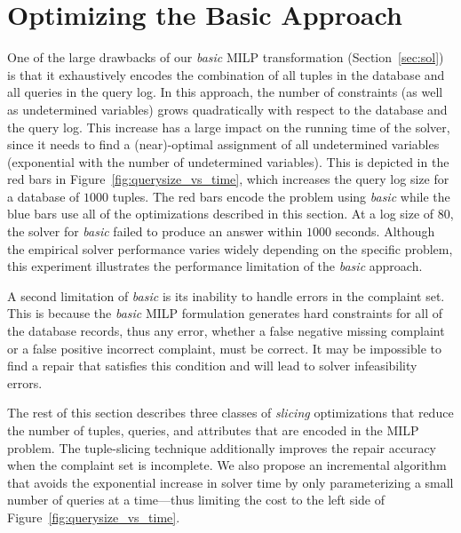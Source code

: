 
\section{Optimizing the Basic Approach}
\label{sec:opt}

One of the large drawbacks of our \emph{basic} MILP transformation (Section~\ref{sec:sol}) is
that it exhaustively encodes the combination of all tuples in the database and all queries
in the query log.  In this approach, the number of constraints (as well as undetermined variables) 
grows quadratically with respect to the database and the query log.
This increase has a large impact on the running time of the solver, since it needs to find a (near)-optimal 
assignment of all undetermined variables (exponential with the number of undetermined variables).
This is depicted in the red bars in Figure~\ref{fig:querysize_vs_time}, which increases
the query log size for a database of $1000$ tuples.  The red bars encode the problem using \emph{basic} while the blue bars
use all of the optimizations described in this section.
At a log size of $80$, the solver for \emph{basic} failed to produce an answer within $1000$ seconds.
Although the empirical solver performance varies widely depending on the specific problem, 
this experiment illustrates the performance limitation of the \emph{basic} approach. 

A second limitation of \emph{basic} is its inability to handle errors in the complaint set.
This is because the \emph{basic} MILP formulation generates hard constraints for all of the database records, thus any error, whether a false negative missing complaint or a false positive incorrect complaint, must be correct.
It may be impossible to find a repair that satisfies this condition and will lead to solver infeasibility errors.


The rest of this section describes three classes of \emph{slicing} optimizations that 
reduce the number of tuples, queries, and attributes that are encoded in the MILP problem. 
The tuple-slicing technique additionally improves the repair accuracy when the complaint set is incomplete. %
We also propose an incremental algorithm that avoids the exponential increase in solver time by only parameterizing a small number of queries at a time---thus limiting
the cost to the left side of Figure~\ref{fig:querysize_vs_time}.



